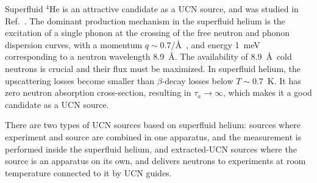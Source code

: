 Superfluid $^4$He is an attractive candidate as a UCN source, and was
studied in Ref.~\cite{Golub77}. The dominant production mechanism in
the superfluid helium is the excitation of a single phonon at the
crossing of the free neutron and phonon dispersion curves, with a
momentum $q\sim 0.7$/\AA~\cite{Brome2001}, and energy 1~meV
corresponding to a neutron wavelength 8.9~\AA. The availability of
8.9~\AA~cold neutrons is crucial and their flux must be maximized. In
superfluid helium, the upscattering losses become smaller than
$\beta$-decay losses below $T \sim 0.7$~K. It has zero neutron
absorption cross-section, resulting in $\tau_a \rightarrow \infty$,
which makes it a good candidate as a UCN source.

There are two types of UCN sources based on superfluid helium: sources
where experiment and source are combined in one apparatus, and the
measurement is performed inside the superfluid helium, and
extracted-UCN sources where the source is an apparatus on its own, and
delivers neutrons to experiments at room temperature connected to it
by UCN guides.



